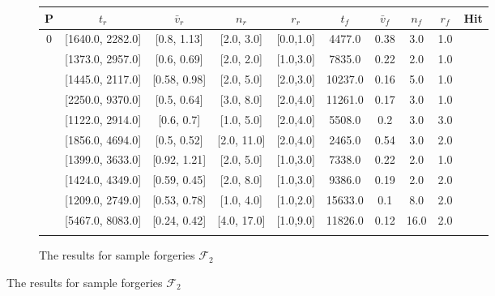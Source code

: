 \documentclass[a4paper, oneside]{csthesis}
\newcommand{\xmark}{\ding{55}}%
\begin{document}
\begin{figure}
    \begin{subfigure}[b]{\textwidth}
            \centering
            \tabcolsep 4pt
            \small
            \begin{tabular}{c|cccc||cccc||c}
            \hline
            \textbf{P} & $t_r$ & $\bar{v}_r$ & $n_r$ & $r_r$ & $t_f$ & $\bar{v}_f$ & $n_f$ & $r_f$ & Hit \\
            \hline
            0 & [1640.0, 2282.0] & [0.8, 1.13] & [2.0, 3.0] & [0.0,1.0] & 4477.0 & 0.38 & 3.0 & 1.0 & \xmark \\ \hdashline[0.5pt/3pt]
            1 & [1373.0, 2957.0] & [0.6, 0.69] & [2.0, 2.0] & [1.0,3.0] & 7835.0 & 0.22 & 2.0 & 1.0 & \xmark \\ \hdashline[0.5pt/3pt]
            2 & [1445.0, 2117.0] & [0.58, 0.98] & [2.0, 5.0] & [2.0,3.0] & 10237.0 & 0.16 & 5.0 & 1.0 & \xmark \\ \hdashline[0.5pt/3pt]
            3 & [2250.0, 9370.0] & [0.5, 0.64] & [3.0, 8.0] & [2.0,4.0] & 11261.0 & 0.17 & 3.0 & 1.0 & \xmark \\ \hdashline[0.5pt/3pt]
            4 & [1122.0, 2914.0] & [0.6, 0.7] & [1.0, 5.0] & [2.0,4.0] & 5508.0 & 0.2 & 3.0 & 3.0 & \xmark \\ \hdashline[0.5pt/3pt]
            5 & [1856.0, 4694.0] & [0.5, 0.52] & [2.0, 11.0] & [2.0,4.0] & 2465.0 & 0.54 & 3.0 & 2.0 & \xmark \\ \hdashline[0.5pt/3pt]
            6 & [1399.0, 3633.0] & [0.92, 1.21] & [2.0, 5.0] & [1.0,3.0] & 7338.0 & 0.22 & 2.0 & 1.0 & \xmark \\ \hdashline[0.5pt/3pt]
            7 & [1424.0, 4349.0] & [0.59, 0.45] & [2.0, 8.0] & [1.0,3.0] & 9386.0 & 0.19 & 2.0 & 2.0 & \xmark \\ \hdashline[0.5pt/3pt]
            8 & [1209.0, 2749.0] & [0.53, 0.78] & [1.0, 4.0] & [1.0,2.0] & 15633.0 & 0.1 & 8.0 & 2.0 & \xmark \\ \hdashline[0.5pt/3pt]
            9 & [5467.0, 8083.0] & [0.24, 0.42] & [4.0, 17.0] & [1.0,9.0] & 11826.0 & 0.12 & 16.0 & 2.0 & \xmark \\ \hdashline[0.5pt/3pt]
            \hline
            \end{tabular}
            \label{tbl:global-features-forg-sample}
            \caption{The results for sample forgeries $\mathcal{F}_2$}
    \end{subfigure}%


\end{figure}
\end{document}
